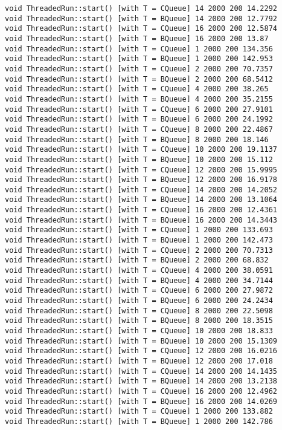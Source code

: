\begin{verbatim}
void ThreadedRun::start() [with T = CQueue] 14 2000 200 14.2292
void ThreadedRun::start() [with T = BQueue] 14 2000 200 12.7792
void ThreadedRun::start() [with T = CQueue] 16 2000 200 12.5874
void ThreadedRun::start() [with T = BQueue] 16 2000 200 13.87
void ThreadedRun::start() [with T = CQueue] 1 2000 200 134.356
void ThreadedRun::start() [with T = BQueue] 1 2000 200 142.953
void ThreadedRun::start() [with T = CQueue] 2 2000 200 70.7357
void ThreadedRun::start() [with T = BQueue] 2 2000 200 68.5412
void ThreadedRun::start() [with T = CQueue] 4 2000 200 38.265
void ThreadedRun::start() [with T = BQueue] 4 2000 200 35.2155
void ThreadedRun::start() [with T = CQueue] 6 2000 200 27.9101
void ThreadedRun::start() [with T = BQueue] 6 2000 200 24.1992
void ThreadedRun::start() [with T = CQueue] 8 2000 200 22.4867
void ThreadedRun::start() [with T = BQueue] 8 2000 200 18.146
void ThreadedRun::start() [with T = CQueue] 10 2000 200 19.1137
void ThreadedRun::start() [with T = BQueue] 10 2000 200 15.112
void ThreadedRun::start() [with T = CQueue] 12 2000 200 15.9995
void ThreadedRun::start() [with T = BQueue] 12 2000 200 16.9178
void ThreadedRun::start() [with T = CQueue] 14 2000 200 14.2052
void ThreadedRun::start() [with T = BQueue] 14 2000 200 13.1064
void ThreadedRun::start() [with T = CQueue] 16 2000 200 12.4361
void ThreadedRun::start() [with T = BQueue] 16 2000 200 14.3443
void ThreadedRun::start() [with T = CQueue] 1 2000 200 133.693
void ThreadedRun::start() [with T = BQueue] 1 2000 200 142.473
void ThreadedRun::start() [with T = CQueue] 2 2000 200 70.7313
void ThreadedRun::start() [with T = BQueue] 2 2000 200 68.832
void ThreadedRun::start() [with T = CQueue] 4 2000 200 38.0591
void ThreadedRun::start() [with T = BQueue] 4 2000 200 34.7144
void ThreadedRun::start() [with T = CQueue] 6 2000 200 27.9872
void ThreadedRun::start() [with T = BQueue] 6 2000 200 24.2434
void ThreadedRun::start() [with T = CQueue] 8 2000 200 22.5098
void ThreadedRun::start() [with T = BQueue] 8 2000 200 18.3515
void ThreadedRun::start() [with T = CQueue] 10 2000 200 18.833
void ThreadedRun::start() [with T = BQueue] 10 2000 200 15.1309
void ThreadedRun::start() [with T = CQueue] 12 2000 200 16.0216
void ThreadedRun::start() [with T = BQueue] 12 2000 200 17.018
void ThreadedRun::start() [with T = CQueue] 14 2000 200 14.1435
void ThreadedRun::start() [with T = BQueue] 14 2000 200 13.2138
void ThreadedRun::start() [with T = CQueue] 16 2000 200 12.4962
void ThreadedRun::start() [with T = BQueue] 16 2000 200 14.0269
void ThreadedRun::start() [with T = CQueue] 1 2000 200 133.882
void ThreadedRun::start() [with T = BQueue] 1 2000 200 142.786

\end{verbatim}
